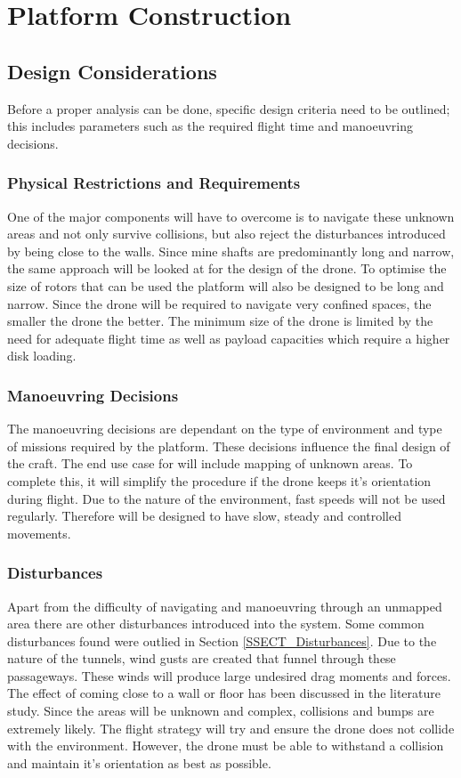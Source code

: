 	\section{Platform Construction}			
		\subsection{Design Considerations}
		Before a proper analysis can be done, specific design criteria need to be outlined; this includes parameters such as the required flight time and manoeuvring decisions.

			\subsubsection{Physical Restrictions and Requirements}
			One of the major components \projectName will have to overcome is to navigate these unknown areas and not only survive collisions, but also reject the disturbances introduced by being close to the walls. Since mine shafts are predominantly long and narrow, the same approach will be looked at for the design of the drone. To optimise the size of rotors that can be used the platform will also be designed to be long and narrow. 
			Since the drone will be required to navigate very confined spaces, the smaller the drone the better. The minimum size of the drone is limited by the need for adequate flight time as well as payload capacities which require a higher disk loading.
			
			\subsubsection{Manoeuvring Decisions}
			The manoeuvring decisions are dependant on the type of environment and type of missions required by the platform. These decisions influence the final design of the craft.
			The end use case for \projectName will include mapping of unknown areas. To complete this, it will simplify the procedure if the drone keeps it's orientation during flight. Due to the nature of the environment, fast speeds will not be used regularly. Therefore \projectName will be designed to have slow, steady and controlled movements.
			
			\subsubsection{Disturbances}
			Apart from the difficulty of navigating and manoeuvring through an unmapped area there are other disturbances introduced into the system. Some common disturbances found were outlied in Section \ref{SSECT_Disturbances}.
			Due to the nature of the tunnels, wind gusts are created that funnel through these passageways. These winds will produce large undesired drag moments and forces.
			The effect of coming close to a wall or floor has been discussed in the literature study. Since the areas will be unknown and complex, collisions and bumps are extremely likely. The flight strategy will try and ensure the drone does not collide with the environment. However, the drone must be able to withstand a collision and maintain it's orientation as best as possible.
			
